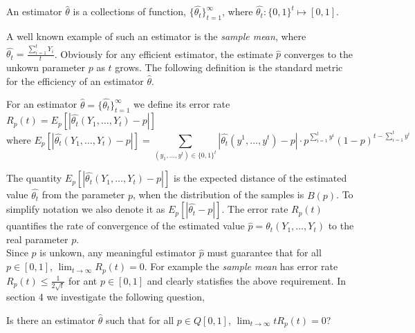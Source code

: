 \begin{definition}
  An estimator $\hat{\theta}$ is a collections of function,
  $\{\hat{\theta_t}\}_{t=1}^{\infty}$, where
  $\hat{\theta_t}: \{0,1\}^t\mapsto [0,1]$.
\end{definition}

A well known example of such an estimator is the
\emph{sample mean}, where $\hat{\theta_t}=\frac{\sum_{i=1}^tY_i}{t}$.
\noindent Obviously for any efficient estimator, the estimate $\hat{p}$
converges to the unkown parameter $p$ as $t$ grows. The following definition is
the standard metric for the efficiency of an estimator $\hat{\theta}$.

\begin{definition}
  For an estimator $\hat{\theta}
  =\{\hat{\theta_t}\}_{t=1}^\infty$ we define its  error rate $R_p(t) =
  E_p[|\hat{\theta_t}(Y_1,\ldots,Y_t) - p|]$ \[\text{where
    }E_p[|\hat{\theta_t}(Y_1,\ldots,Y_t) - p|]= \sum_{(y_1,\ldots,y^t)\in
      \{0,1\}^t}|\hat{\theta_t}(y^1,\ldots,y^t) -p| \cdot
    p^{\sum_{i=1}^ty^i}(1-p)^{t-\sum_{i=1}^ty^i}\]
\end{definition}

The quantity $E_p[|\hat{\theta_t}(Y_1,\ldots,Y_t) - p|]$ is the expected distance
of the estimated value $\hat{\theta_t}$ from the parameter $p$, when the
distribution of the samples is $B(p)$. To simplify notation we also denote it
as $E_p[|\hat{\theta_t} - p|]$. The error rate $R_p(t)$ quantifies the rate of
convergence of the estimated value $\hat{p} =\theta_t(Y_1,\ldots,Y_t)$ to the
real parameter $p$. \\ Since $p$ is unkown, any meaningful estimator $\hat{p}$
must guarantee that for all $p \in [0,1]$, $\lim_{t \rightarrow \infty}
R_p(t)=0$. For example the \emph{sample mean} has error rate $R_p(t) \leq
\frac{1}{2\sqrt{t}}$ for ant $p \in [0,1]$ and clearly statisfies the above
requirement. In section 4 we investigate the following question,

\begin{question}
  Is there an estimator $\hat{\theta}$ such that for all $p \in
  Q[0,1]$, $\lim_{t \rightarrow \infty}t R_p(t)=0$?
\end{question}


